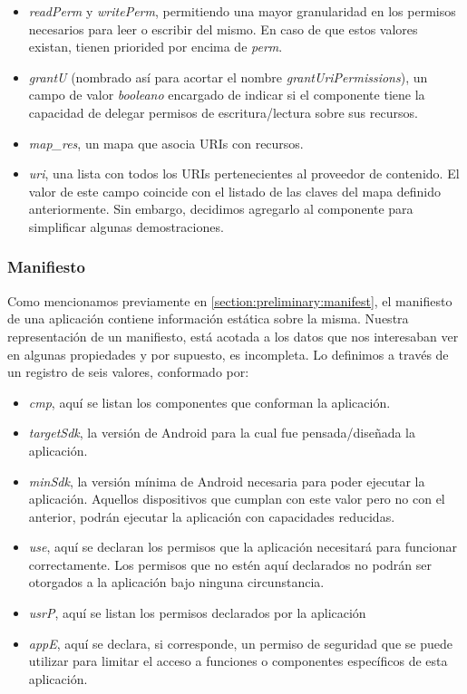 \begin{itemize}
    \item \textit{readPerm} y \textit{writePerm}, permitiendo una mayor granularidad en los permisos
          necesarios para leer o escribir del mismo. En caso de que estos valores existan, tienen priorided por
          encima de \textit{perm}.
    \item \textit{grantU} (nombrado así para acortar el nombre \textit{grantUriPermissions}), un campo de
          valor \textit{booleano} encargado de indicar si el componente tiene la capacidad de delegar permisos
          de escritura/lectura sobre sus recursos.
    \item \textit{map\_res}, un mapa que asocia URIs con recursos.
    \item \textit{uri}, una lista con todos los URIs pertenecientes al proveedor de contenido. El valor
          de este campo coincide con el listado de las claves del mapa definido anteriormente. Sin embargo,
          decidimos agregarlo al componente para simplificar algunas demostraciones.
\end{itemize}


\subsubsection*{Manifiesto}
Como mencionamos previamente en \ref{section:preliminary:manifest}, el manifiesto de una aplicación
contiene información estática sobre la misma. Nuestra representación de un manifiesto, está acotada a los
datos que nos interesaban ver en algunas propiedades y por supuesto, es incompleta. Lo definimos a través
de un registro de seis valores, conformado por:

\begin{itemize}
    \item \textit{cmp}, aquí se listan los componentes que conforman la aplicación.
    \item \textit{targetSdk}, la versión de Android para la cual fue pensada/diseñada la aplicación.
    \item \textit{minSdk}, la versión mínima de Android necesaria para poder ejecutar la aplicación.
          Aquellos dispositivos que cumplan con este valor pero no con el anterior, podrán ejecutar la
          aplicación con capacidades reducidas.
    \item \textit{use}, aquí se declaran los permisos que la aplicación necesitará para funcionar
          correctamente. Los permisos que no estén aquí declarados no podrán ser otorgados a la aplicación bajo
          ninguna circunstancia.
    \item \textit{usrP}, aquí se listan los permisos declarados por la aplicación
    \item \textit{appE}, aquí se declara, si corresponde, un permiso de seguridad que se puede utilizar
          para limitar el acceso a funciones o componentes específicos de esta aplicación.
\end{itemize}

